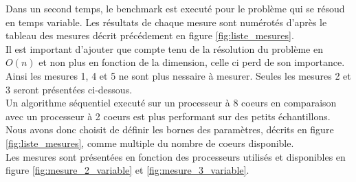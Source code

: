 Dans un second temps, le benchmark est executé pour le problème qui se résoud en temps variable. Les résultats de chaque mesure sont numérotés d'après le tableau des mesures décrit précédement en figure \ref{fig:liste_mesures}.\\

Il est important d'ajouter que compte tenu de la résolution du problème en $O(n)$ et non plus en fonction de la dimension, celle ci perd de son importance. Ainsi les mesures 1, 4 et 5 ne sont plus nessaire à mesurer. Seules les mesures 2 et 3 seront présentées ci-dessous.\\

Un algorithme séquentiel executé sur un processeur à 8 coeurs en comparaison avec un processeur à 2 coeurs est plus performant sur des petits échantillons. Nous avons donc choisit de définir les bornes des paramètres, décrits en figure \ref{fig:liste_mesures}, comme multiple du nombre de coeurs disponible.\\

Les mesures sont présentées en fonction des processeurs utilisés et disponibles en figure \ref{fig:mesure_2_variable} et \ref{fig:mesure_3_variable}.

